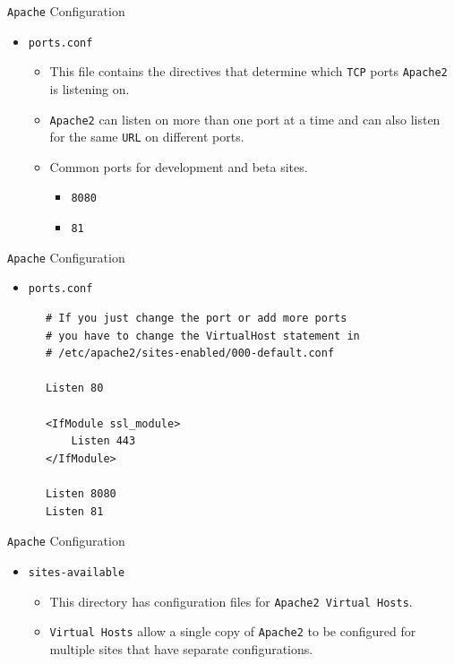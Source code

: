 \documentclass[xcolor=table]{beamer}
\begin{document}
\begin{frame}{\texttt{Apache} Configuration}
  \begin{itemize}
    \item \texttt{ports.conf} 
      \begin{itemize}
        \item This file contains the directives that determine which \texttt{TCP} ports \texttt{Apache2} is listening on.
        \item \texttt{Apache2} can listen on more than one port at a time and can also listen for the same \texttt{URL} on different ports.
        \item Common ports for development and beta sites.
          \begin{itemize}
            \item \texttt{8080}
            \item \texttt{81}
          \end{itemize}
      \end{itemize}
  \end{itemize}
\end{frame}

\begin{frame}[fragile]{\texttt{Apache} Configuration}
  \begin{itemize}
    \item \texttt{ports.conf}
  \end{itemize}
  \begin{tcolorbox}
    \lstset{
      basicstyle=\tiny\ttfamily,
    }
    \begin{lstlisting}
      # If you just change the port or add more ports 
      # you have to change the VirtualHost statement in
      # /etc/apache2/sites-enabled/000-default.conf

      Listen 80

      <IfModule ssl_module>
          Listen 443
      </IfModule>

      Listen 8080
      Listen 81
    \end{lstlisting}
  \end{tcolorbox}
\end{frame}

\begin{frame}{\texttt{Apache} Configuration}
  \begin{itemize}
    \item \texttt{sites-available} 
      \begin{itemize}
        \item This directory has configuration files for \texttt{Apache2 Virtual Hosts}. 
        \item \texttt{Virtual Hosts} allow a single copy of \texttt{Apache2} to be configured for multiple sites that have separate configurations.
      \end{itemize}
  \end{itemize}
\end{frame}
\end{document}
